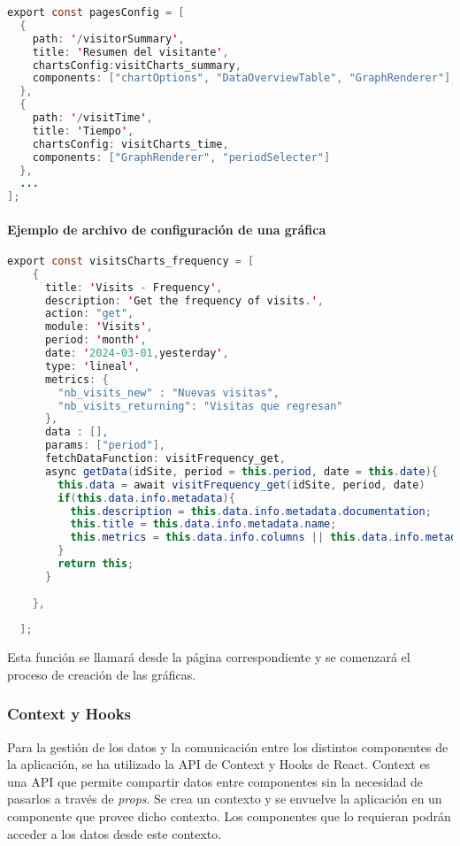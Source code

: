 \begin{lstlisting}[language=Java]
    export const pagesConfig = [
  {
    path: '/visitorSummary',
    title: 'Resumen del visitante',
    chartsConfig:visitCharts_summary,
    components: ["chartOptions", "DataOverviewTable", "GraphRenderer"],
  },
  {
    path: '/visitTime',
    title: 'Tiempo',
    chartsConfig: visitCharts_time,
    components: ["GraphRenderer", "periodSelecter"]
  },
  ...
];
\end{lstlisting}

\paragraph{Ejemplo de archivo de configuración de una gráfica}

\begin{lstlisting}[language=Java]
    export const visitsCharts_frequency = [
    {
      title: 'Visits - Frequency',
      description: 'Get the frequency of visits.',
      action: "get",
      module: 'Visits',
      period: 'month',
      date: '2024-03-01,yesterday',
      type: 'lineal',
      metrics: {
        "nb_visits_new" : "Nuevas visitas",
        "nb_visits_returning": "Visitas que regresan"
      },
      data : [],
      params: ["period"],
      fetchDataFunction: visitFrequency_get,
      async getData(idSite, period = this.period, date = this.date){
        this.data = await visitFrequency_get(idSite, period, date)
        if(this.data.info.metadata){
          this.description = this.data.info.metadata.documentation;
          this.title = this.data.info.metadata.name;
          this.metrics = this.data.info.columns || this.data.info.metadata.metrics || this.metrics;
        }  
        return this;
      }
      
    },
   
  ];
\end{lstlisting}

Esta función se llamará desde la página correspondiente y se comenzará el proceso de creación de las gráficas. 

\subsubsection{Context y Hooks}
\label{sec:context-hooks}

Para la gestión de los datos y la comunicación entre los distintos componentes de la aplicación, se ha utilizado la API de Context 
y Hooks de React. Context es una API que permite compartir datos entre componentes sin la necesidad de pasarlos a través de \textit{props}. 
Se crea un contexto y se envuelve la aplicación en un componente que provee dicho contexto. Los componentes que lo requieran 
podrán acceder a los datos desde este contexto.


